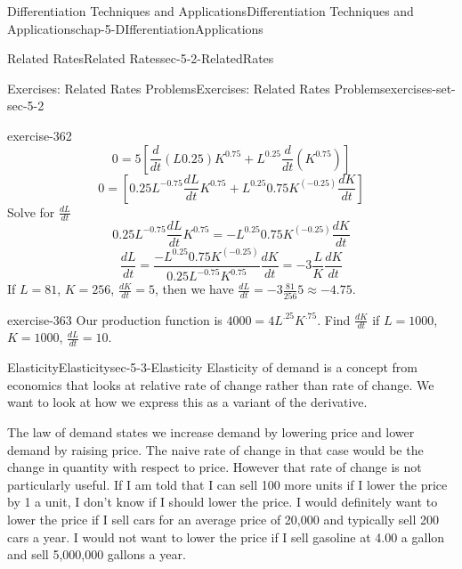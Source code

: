 \documentclass[oneside,10pt,]{book}
\numberwithin{equation}{section}
\begin{document}
\begin{chapterptx}{Differentiation Techniques and Applications}{}{Differentiation Techniques and Applications}{}{}{chap-5-DIfferentiationApplications}
\begin{sectionptx}{Related Rates}{}{Related Rates}{}{}{sec-5-2-RelatedRates}
\begin{exercises-subsection-numberless}{Exercises: Related Rates Problems}{}{Exercises: Related Rates Problems}{}{}{exercises-set-sec-5-2}
\begin{divisionexercise}{17}{}{}{exercise-362}
%
\begin{equation*}
0=5[\frac{d}{dt} (L{0.25}) K^{0.75}+L^{0.25} \frac{d}{dt} (K^{0.75}) ]  
\end{equation*}
%
\begin{equation*}
0=[0.25 L^{-0.75}  \frac{dL}{dt} K^{0.75}+L^{0.25} 0.75K^(-0.25) \frac{dK}{dt}]
\end{equation*}
\hypertarget{p-2016}{}%
Solve for  \(\frac{dL}{dt}\)%
%
\begin{equation*}
0.25 L^{-0.75}  \frac{dL}{dt} K^{0.75}=-L^{0.25} 0.75K^(-0.25)  \frac{dK}{dt}
\end{equation*}
%
\begin{equation*}
\frac{dL}{dt}=\frac{-L^{0.25} 0.75K^(-0.25)}{ 0.25 L^{-0.75} K^{0.75}}   \frac{dK}{dt}            =-3  \frac{L}{K}  \frac{dK}{dt}
\end{equation*}
\hypertarget{p-2017}{}%
If \(L=81\), \(K=256\),  \(\frac{dK}{dt}=5\), then we have \(\frac{dL}{dt}=-3  \frac{81}{256}5 \approx -4.75\).%
\end{divisionexercise}%
\begin{divisionexercise}{18}{}{}{exercise-363}%
\hypertarget{p-2018}{}%
Our production function is \(4000=4L^.25 K^.75\). Find \(\frac{dK}{dt}\) if \(L=1000\), \(K=1000\),  \(\frac{dL}{dt}=10\).%
\end{divisionexercise}%
\end{exercises-subsection-numberless}
\end{sectionptx}
%
%
\typeout{************************************************}
\typeout{************************************************}
%
\begin{sectionptx}{Elasticity}{}{Elasticity}{}{}{sec-5-3-Elasticity}
\hypertarget{p-2019}{}%
Elasticity of demand is a concept from economics that looks at relative rate of change rather than rate of change.  We want to look at how we express this as a variant of the derivative.%
\par
\hypertarget{p-2020}{}%
The law of demand states we increase demand by lowering price and lower demand by raising price.  The naive rate of change in that case would be the change in quantity with respect to price.  However that rate of change is not particularly useful.  If I am told that I can sell 100 more units if I lower the price by \textdollar{}1 a unit, I don’t know if I should lower the price.  I would definitely want to lower the price if I sell cars for an average price of \textdollar{}20,000 and typically sell 200 cars a year.  I would not want to lower the price if I sell gasoline at \textdollar{}4.00 a gallon and sell 5,000,000 gallons a year.%

\end{sectionptx}
\end{chapterptx}
\end{document}
